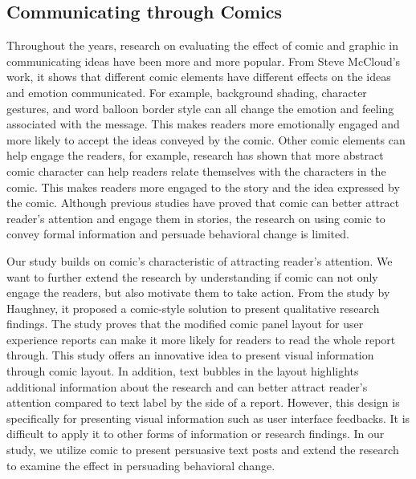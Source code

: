 \subsection{Communicating through Comics}
Throughout the years, research on evaluating the effect of comic and graphic in communicating ideas have been more and more popular. From Steve McCloud's work, it shows that different comic elements have different effects on the ideas and emotion communicated. For example, background shading, character gestures, and word balloon border style can all change the emotion and feeling associated with the message. This makes readers more emotionally engaged and more likely to accept the ideas conveyed by the comic. Other comic elements can help engage the readers, for example, research has shown that more abstract comic character can help readers relate themselves with the characters in the comic. This makes readers more engaged to the story and the idea expressed by the comic. Although previous studies have proved that comic can better attract reader's attention and engage them in stories, the research on using comic to convey formal information and persuade behavioral change is limited.\par
Our study builds on comic's characteristic of attracting reader's attention. We want to further extend the research by understanding if comic can not only engage the readers, but also motivate them to take action. From the study by Haughney, it proposed a comic-style solution to present qualitative research findings. The study proves that the modified comic panel layout for user experience reports can make it more likely for readers to read the whole report through. This study offers an innovative idea to present visual information through comic layout. In addition, text bubbles in the layout highlights additional information about the research and can better attract reader's attention compared to text label by the side of a report. However, this design is specifically for presenting visual information such as user interface feedbacks. It is difficult to apply it to other forms of information or research findings. In our study, we utilize comic to present persuasive text posts and extend the research to examine the effect in persuading behavioral change.\par

